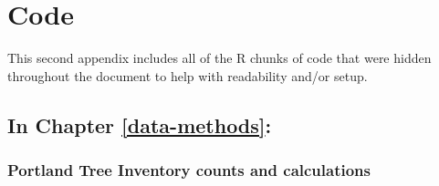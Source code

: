 \documentclass[12pt,twoside]{reedthesis}
\begin{document}
\hypertarget{code}{%
\chapter{Code}\label{code}}

This second appendix includes all of the R chunks of code that were hidden throughout the document to help with readability and/or setup.

\hypertarget{in-chapter-refdata-methods}{%
\section{\texorpdfstring{\textbf{In Chapter} \ref{data-methods}\textbf{:}}{In Chapter \ref{data-methods}:}}\label{in-chapter-refdata-methods}}

\hypertarget{portland-tree-inventory-counts-and-calculations}{%
\subsection{Portland Tree Inventory counts and calculations}\label{portland-tree-inventory-counts-and-calculations}}
\end{document}
